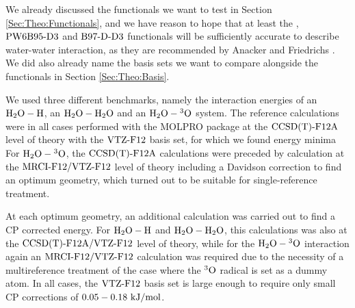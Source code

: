 \documentclass[8.5pt,twoside,twocolumn]{article}
\newcommand\kmo{\enmat{\te {kJ/mol}}}
\theoremstyle{standard}
\begin{document}
We already
discussed the functionals we want to test in Section \ref{Sec:Theo:Functionals}, and we
have reason to hope that at least the \pbez, $\text{PW6B95}\text{-D3}$ and $\text{B97-D}\text{-D3}$ functionals will be sufficiently
accurate to describe water-water interaction, as they are recommended by Anacker and Friedrichs \cite{Anacker2014}.
We did also already name the basis sets we want to compare alongside the functionals in Section \ref{Sec:Theo:Basis}.

We used three different benchmarks, namely the interaction energies of an $\mbox{\ensuremath{\text H _2 \text O-\text H}}$, an $\mbox{\ensuremath{\text H _2 \text O-\text H _2 \text O}}$ and an $\mbox{\ensuremath{\text H _2 \text O-\hspace{.2pt} ^3\text{O}}}$ system.
The reference calculations were in all cases performed with the MOLPRO \cite{MOLPRO_brief} package
at the $\text{CCSD(T)-F12A}$ \cite{KniziaAdlerWerner2009} level of theory with the
$\text{VTZ-F}12$\cite{YousafPeterson2008} basis set, for which we found energy minima
For $\mbox{\ensuremath{\text H _2 \text O-\hspace{.2pt} ^3\text{O}}}$, the $\text{CCSD(T)-F12A}$ calculations were preceded by  
calculation at the $\text{MRCI-F12}/\text{VTZ-F}12$\cite{ShiozakiKniziaWerner2011} level of theory
including a Davidson correction\cite{LanghoffDavidson1974} to find an optimum
geometry, which turned out to be suitable for single-reference treatment.

At each optimum geometry, an additional calculation was carried out to find a CP
corrected energy. For $\mbox{\ensuremath{\text H _2 \text O-\text H}}$ and $\mbox{\ensuremath{\text H _2 \text O-\text H _2 \text O}}$, this calculations was also at the $\text{CCSD(T)-F12A}/\text{VTZ-F}12$ level
of theory, while for the $\mbox{\ensuremath{\text H _2 \text O-\hspace{.2pt} ^3\text{O}}}$ interaction again an $\text{MRCI-F12}/\text{VTZ-F}12$ calculation was
required due to the necessity of a multireference treatment of the case where the
$^3\text O$ radical is set as a dummy atom. In all cases, the $\text{VTZ-F}12$ basis set is 
large enough to require only small CP corrections of $0.05 - 0.18 \ \kmo$. 
\end{document}
